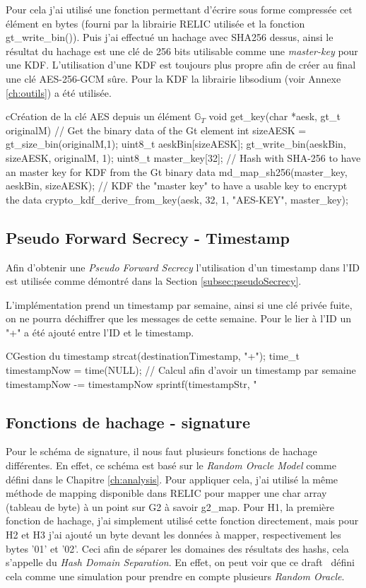 Pour cela j'ai utilisé une fonction permettant d'écrire sous forme compressée cet élément en bytes (fourni par la librairie RELIC utilisée et la fonction gt\_write\_bin()). Puis j'ai effectué un hachage avec SHA256 dessus, ainsi le résultat du hachage est une clé de 256 bits utilisable comme une \textit{master-key} pour une KDF. L'utilisation d'une KDF est toujours plus propre afin de créer au final une clé AES-256-GCM sûre. Pour la KDF la librairie libsodium (voir Annexe \ref{ch:outils}) a été utilisée.

\begin{sourcebox}{c}{Création de la clé AES depuis un élément $\mathbb{G}_T$}
	void get_key(char *aesk, gt_t originalM) {
		// Get the binary data of the Gt element
		int sizeAESK = gt_size_bin(originalM,1);
		uint8_t aeskBin[sizeAESK];
		gt_write_bin(aeskBin, sizeAESK, originalM, 1);
		uint8_t master_key[32];
		// Hash with SHA-256 to have an master key for KDF from the Gt binary data
		md_map_sh256(master_key, aeskBin, sizeAESK);
		// KDF the "master key" to have a usable key to encrypt the data
		crypto_kdf_derive_from_key(aesk, 32, 1, "AES-KEY", master_key);
	}
\end{sourcebox}

\subsection{Pseudo Forward Secrecy - Timestamp}
Afin d'obtenir une \textit{Pseudo Forward Secrecy} l'utilisation d'un timestamp dans l'ID est utilisée comme démontré dans la Section \ref{subsec:pseudoSecrecy}.

L'implémentation prend un timestamp par semaine, ainsi si une clé privée fuite, on ne pourra déchiffrer que les messages de cette semaine. Pour le lier à l'ID un "+" a été ajouté entre l'ID et le timestamp.
\begin{sourcebox}{C}{Gestion du timestamp}
	strcat(destinationTimestamp, "+");
	time_t timestampNow = time(NULL);
	// Calcul afin d'avoir un timestamp par semaine
	timestampNow -= timestampNow %
	sprintf(timestampStr, "%
\end{sourcebox}

\subsection{Fonctions de hachage - signature}
Pour le schéma de signature, il nous faut plusieurs fonctions de hachage différentes. En effet, ce schéma est basé sur le \textit{Random Oracle Model} comme défini dans le Chapitre \ref{ch:analysis}. Pour appliquer cela, j'ai utilisé la même méthode de mapping disponible dans RELIC pour mapper une char array (tableau de byte) à un point sur G2 à savoir g2\_map.
Pour H1, la première fonction de hachage, j'ai simplement utilisé cette fonction directement, mais pour H2 et H3 j'ai ajouté un byte devant les données à mapper, respectivement les bytes '01' et '02'. Ceci afin de séparer les domaines des résultats des hashs, cela s'appelle du \textit{Hash Domain Separation}. En effet, on peut voir que ce draft~\cite{irtf-cfrg-hash-to-curve} défini cela comme une simulation pour prendre en compte plusieurs \textit{Random Oracle}.

